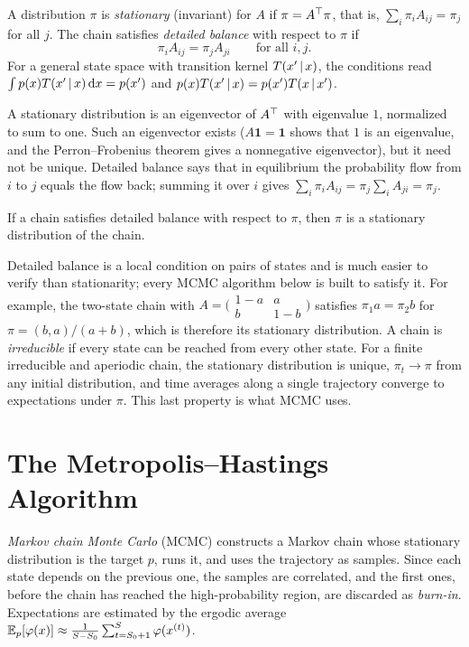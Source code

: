 \begin{definition}\label{def:stationary}
A distribution $\pi$ is \emph{stationary} (invariant) for $A$ if $\pi=A^{\top}\pi$, that is, $\sum_i\pi_iA_{ij}=\pi_j$ for all $j$. The chain satisfies \emph{detailed balance} with respect to $\pi$ if
\[
\pi_iA_{ij}=\pi_jA_{ji}\qquad\text{for all }i,j.
\]
For a general state space with transition kernel $T(x'\,|\, x)$, the conditions read $\int p(x)T(x'\,|\, x)\,\mathrm{d} x=p(x')$ and $p(x)T(x'\,|\, x)=p(x')T(x\,|\, x')$.
\end{definition}

A stationary distribution is an eigenvector of $A^{\top}$ with eigenvalue $1$, normalized to sum to one. Such an eigenvector exists ($A\mathbf1=\mathbf1$ shows that $1$ is an eigenvalue, and the Perron--Frobenius theorem gives a nonnegative eigenvector), but it need not be unique. Detailed balance says that in equilibrium the probability flow from $i$ to $j$ equals the flow back; summing it over $i$ gives $\sum_i\pi_iA_{ij}=\pi_j\sum_iA_{ji}=\pi_j$.

\begin{proposition}\label{prop:detailed-balance}
If a chain satisfies detailed balance with respect to $\pi$, then $\pi$ is a stationary distribution of the chain.
\end{proposition}

Detailed balance is a local condition on pairs of states and is much easier to verify than stationarity; every MCMC algorithm below is built to satisfy it. For example, the two-state chain with $A=\big(\begin{smallmatrix}1-a&a\\b&1-b\end{smallmatrix}\big)$ satisfies $\pi_1a=\pi_2b$ for $\pi=(b,a)/(a+b)$, which is therefore its stationary distribution. A chain is \emph{irreducible} if every state can be reached from every other state. For a finite irreducible and aperiodic chain, the stationary distribution is unique, $\pi_t\to\pi$ from any initial distribution, and time averages along a single trajectory converge to expectations under $\pi$. This last property is what MCMC uses.

\section{The Metropolis--Hastings Algorithm}\label{sec:mh}

\emph{Markov chain Monte Carlo} (MCMC) constructs a Markov chain whose stationary distribution is the target $p$, runs it, and uses the trajectory as samples. Since each state depends on the previous one, the samples are correlated, and the first ones, before the chain has reached the high-probability region, are discarded as \emph{burn-in}. Expectations are estimated by the ergodic average $\mathbb{E}_p[\varphi(x)]\approx\frac1{S-S_0}\sum_{t=S_0+1}^S\varphi(x^{(t)})$.

